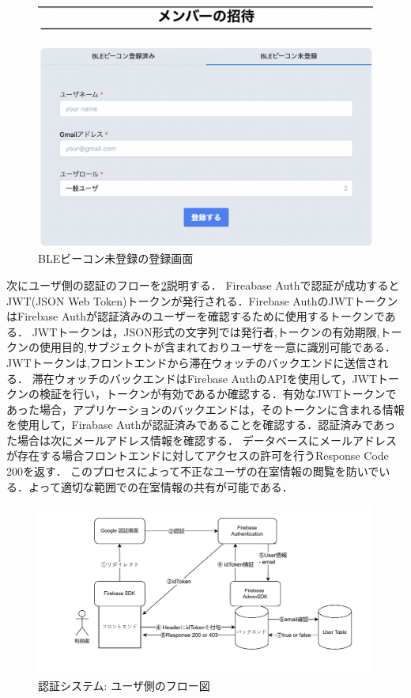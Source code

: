 \begin{figure}[tbh]
  \centering
  \includegraphics[width=16cm]{image/registerNotBLE.png}
  \caption{BLEビーコン未登録の登録画面} \label{fig:registerNotBLE}

\end{figure}


\newpage


次にユーザ側の認証のフローを\ref{fig:userLogin}説明する．
Fireabase Authで認証が成功するとJWT(JSON Web Token)トークンが発行される．Firebase AuthのJWTトークン はFirebase Authが認証済みのユーザーを確認するために使用するトークンである．
JWTトークンは，JSON形式の文字列では発行者,トークンの有効期限,トークンの使用目的,サブジェクトが含まれておりユーザを一意に識別可能である．
JWTトークンは,フロントエンドから滞在ウォッチのバックエンドに送信される．
滞在ウォッチのバックエンドはFirebase AuthのAPIを使用して，JWTトークンの検証を行い，トークンが有効であるか確認する．有効なJWTトークンであった場合，アプリケーションのバックエンドは，そのトークンに含まれる情報を使用して，Firabase Authが認証済みであることを確認する．認証済みであった場合は次にメールアドレス情報を確認する．
データベースにメールアドレスが存在する場合フロントエンドに対してアクセスの許可を行うResponse Code 200を返す．
このプロセスによって不正なユーザの在室情報の閲覧を防いでいる．よって適切な範囲での在室情報の共有が可能である．



\newpage

\begin{figure}[h]
  \centering  %
  \includegraphics[clip,scale = 0.8]{image/userLogin.pdf}
  \caption{認証システム: ユーザ側のフロー図}    \label{fig:userLogin}
\end{figure}


